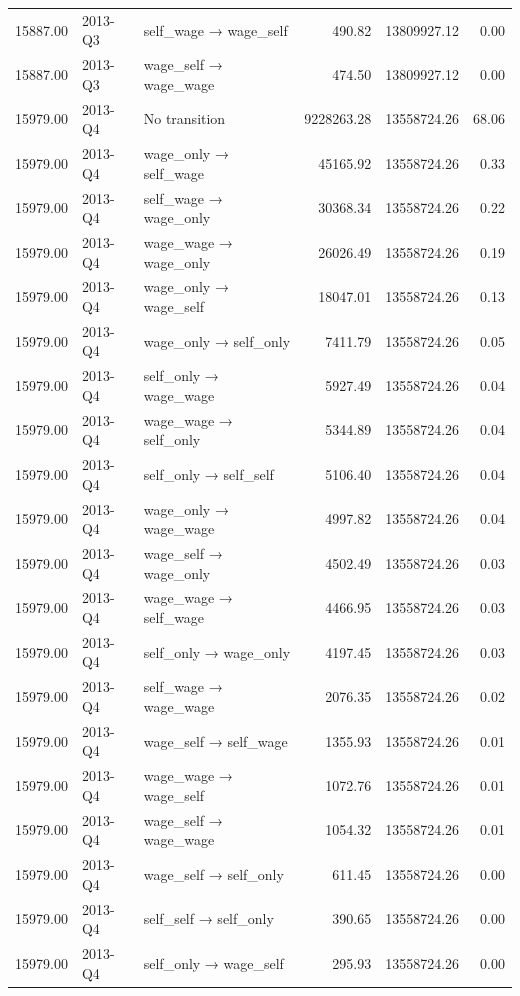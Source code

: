 \begin{table}[ht]
{\begin{tabular}{rllrrr}
  15887.00 & 2013-Q3 & self\_wage → wage\_self & 490.82 & 13809927.12 & 0.00 \\ 
  15887.00 & 2013-Q3 & wage\_self → wage\_wage & 474.50 & 13809927.12 & 0.00 \\ 
  15979.00 & 2013-Q4 & No transition & 9228263.28 & 13558724.26 & 68.06 \\ 
  15979.00 & 2013-Q4 & wage\_only → self\_wage & 45165.92 & 13558724.26 & 0.33 \\ 
  15979.00 & 2013-Q4 & self\_wage → wage\_only & 30368.34 & 13558724.26 & 0.22 \\ 
  15979.00 & 2013-Q4 & wage\_wage → wage\_only & 26026.49 & 13558724.26 & 0.19 \\ 
  15979.00 & 2013-Q4 & wage\_only → wage\_self & 18047.01 & 13558724.26 & 0.13 \\ 
  15979.00 & 2013-Q4 & wage\_only → self\_only & 7411.79 & 13558724.26 & 0.05 \\ 
  15979.00 & 2013-Q4 & self\_only → wage\_wage & 5927.49 & 13558724.26 & 0.04 \\ 
  15979.00 & 2013-Q4 & wage\_wage → self\_only & 5344.89 & 13558724.26 & 0.04 \\ 
  15979.00 & 2013-Q4 & self\_only → self\_self & 5106.40 & 13558724.26 & 0.04 \\ 
  15979.00 & 2013-Q4 & wage\_only → wage\_wage & 4997.82 & 13558724.26 & 0.04 \\ 
  15979.00 & 2013-Q4 & wage\_self → wage\_only & 4502.49 & 13558724.26 & 0.03 \\ 
  15979.00 & 2013-Q4 & wage\_wage → self\_wage & 4466.95 & 13558724.26 & 0.03 \\ 
  15979.00 & 2013-Q4 & self\_only → wage\_only & 4197.45 & 13558724.26 & 0.03 \\ 
  15979.00 & 2013-Q4 & self\_wage → wage\_wage & 2076.35 & 13558724.26 & 0.02 \\ 
  15979.00 & 2013-Q4 & wage\_self → self\_wage & 1355.93 & 13558724.26 & 0.01 \\ 
  15979.00 & 2013-Q4 & wage\_wage → wage\_self & 1072.76 & 13558724.26 & 0.01 \\ 
  15979.00 & 2013-Q4 & wage\_self → wage\_wage & 1054.32 & 13558724.26 & 0.01 \\ 
  15979.00 & 2013-Q4 & wage\_self → self\_only & 611.45 & 13558724.26 & 0.00 \\ 
  15979.00 & 2013-Q4 & self\_self → self\_only & 390.65 & 13558724.26 & 0.00 \\ 
  15979.00 & 2013-Q4 & self\_only → wage\_self & 295.93 & 13558724.26 & 0.00 \\ 

\end{tabular}}
\end{table}
